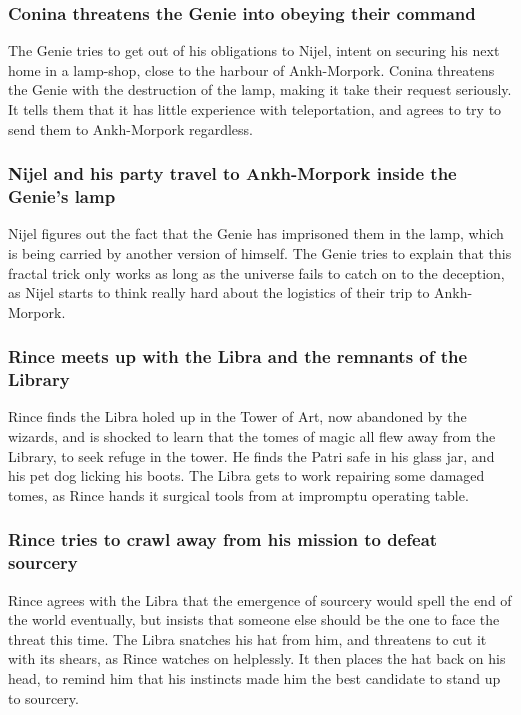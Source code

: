 \subsubsection{\Gls{Conina} threatens the \Gls{Genie} into obeying their command}
The \Gls{Genie} tries to get out of his obligations to \Gls{Nijel}, intent on securing his next
home in a lamp-shop, close to the harbour of Ankh-Morpork. \Gls{Conina} threatens the \Gls{Genie}
with the destruction of the lamp, making it take their request seriously. It tells them that it has
little experience with teleportation, and agrees to try to send them to Ankh-Morpork regardless.

\subsubsection{\Gls{Nijel} and his party travel to Ankh-Morpork inside the \Gls{Genie}'s lamp}
\Gls{Nijel} figures out the fact that the \Gls{Genie} has imprisoned them in the lamp, which is
being carried by another version of himself. The \Gls{Genie} tries to explain that this fractal
trick only works as long as the universe fails to catch on to the deception, as \Gls{Nijel} starts
to think really hard about the logistics of their trip to Ankh-Morpork.

\subsubsection{\Gls{Rince} meets up with the \Gls{Libra} and the remnants of the Library}
\Gls{Rince} finds the \Gls{Libra} holed up in the Tower of Art, now abandoned by the wizards, and
is shocked to learn that the tomes of magic all flew away from the Library, to seek refuge in the
tower. He finds the \Gls{Patri} safe in his glass jar, and his pet dog licking his boots. The
\Gls{Libra} gets to work repairing some damaged tomes, as \Gls{Rince} hands it surgical tools from
at impromptu operating table.

\subsubsection{\Gls{Rince} tries to crawl away from his mission to defeat sourcery}
\Gls{Rince} agrees with the \Gls{Libra} that the emergence of sourcery would spell the end of the
world eventually, but insists that someone else should be the one to face the threat this time.
The \Gls{Libra} snatches his hat from him, and threatens to cut it with its shears, as \Gls{Rince}
watches on helplessly. It then places the hat back on his head, to remind him that his instincts
made him the best candidate to stand up to sourcery.

